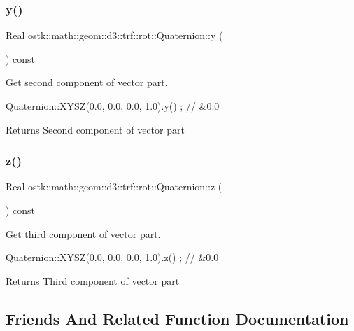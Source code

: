 \subsubsection{\texorpdfstring{y()}{y()}}
{\footnotesize\ttfamily Real ostk\+::math\+::geom\+::d3\+::trf\+::rot\+::\+Quaternion\+::y (\begin{DoxyParamCaption}{ }\end{DoxyParamCaption}) const}



Get second component of vector part. 


\begin{DoxyCode}
Quaternion::XYSZ(0.0, 0.0, 0.0, 1.0).y() ; \textcolor{comment}{// &0.0}
\end{DoxyCode}


\begin{DoxyReturn}{Returns}
Second component of vector part 
\end{DoxyReturn}
\mbox{\label{classostk_1_1math_1_1geom_1_1d3_1_1trf_1_1rot_1_1_quaternion_a0bb2ccff6bafbafc61232574584fb65d}} 
\subsubsection{\texorpdfstring{z()}{z()}}
{\footnotesize\ttfamily Real ostk\+::math\+::geom\+::d3\+::trf\+::rot\+::\+Quaternion\+::z (\begin{DoxyParamCaption}{ }\end{DoxyParamCaption}) const}



Get third component of vector part. 


\begin{DoxyCode}
Quaternion::XYSZ(0.0, 0.0, 0.0, 1.0).z() ; \textcolor{comment}{// &0.0}
\end{DoxyCode}


\begin{DoxyReturn}{Returns}
Third component of vector part 
\end{DoxyReturn}


\subsection{Friends And Related Function Documentation}
\mbox{\label{classostk_1_1math_1_1geom_1_1d3_1_1trf_1_1rot_1_1_quaternion_a2806bc2f5b9d299c075c51740cfa48ea}} 
